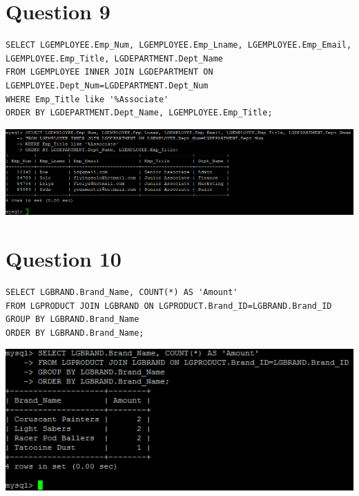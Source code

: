\documentclass[a4paper,10pt]{article}
\begin{document}
\section {Question 9}
\lstset{
            language=SQL,
            breaklines=true
            }
        \begin{lstlisting}[frame=single]
        SELECT LGEMPLOYEE.Emp_Num, LGEMPLOYEE.Emp_Lname, LGEMPLOYEE.Emp_Email, LGEMPLOYEE.Emp_Title, LGDEPARTMENT.Dept_Name
FROM LGEMPLOYEE INNER JOIN LGDEPARTMENT ON LGEMPLOYEE.Dept_Num=LGDEPARTMENT.Dept_Num
WHERE Emp_Title like '%Associate'
ORDER BY LGDEPARTMENT.Dept_Name, LGEMPLOYEE.Emp_Title;

        \end{lstlisting}
\includegraphics{Queries/Question_9/Question_9_screenshot.PNG}
\maketitle\section {Question 10}
\lstset{
            language=SQL,
            breaklines=true
            }
        \begin{lstlisting}[frame=single]
        SELECT LGBRAND.Brand_Name, COUNT(*) AS 'Amount'
FROM LGPRODUCT JOIN LGBRAND ON LGPRODUCT.Brand_ID=LGBRAND.Brand_ID
GROUP BY LGBRAND.Brand_Name
ORDER BY LGBRAND.Brand_Name;

        \end{lstlisting}
\includegraphics{Queries/Question_10/Question_10_screenshot.PNG}
\end{document}

